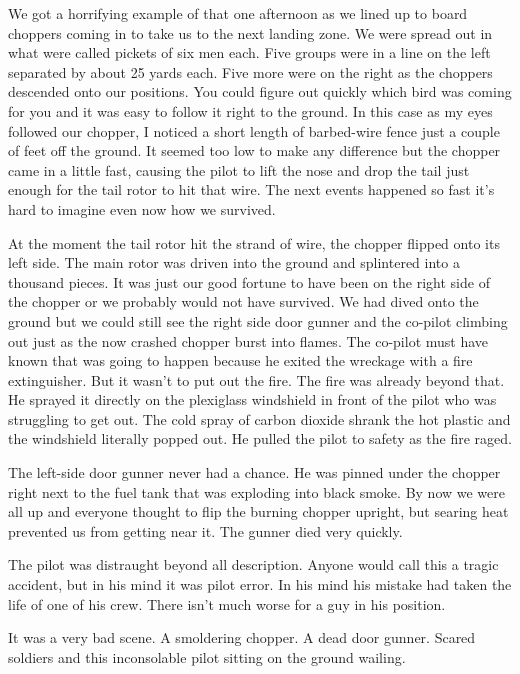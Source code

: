 We got a horrifying example of that one afternoon as we lined up to
board choppers coming in to take us to the next landing zone. We were
spread out in what were called pickets of six men each. Five groups were
in a line on the left separated by about 25 yards each. Five more were
on the right as the choppers descended onto our positions. You could
figure out quickly which bird was coming for you and it was easy to
follow it right to the ground. In this case as my eyes followed our
chopper, I noticed a short length of barbed-wire fence just a couple of
feet off the ground. It seemed too low to make any difference but the
chopper came in a little fast, causing the pilot to lift the nose and
drop the tail just enough for the tail rotor to hit that wire. The next
events happened so fast it's hard to imagine even now how we survived.

At the moment the tail rotor hit the strand of wire, the chopper flipped
onto its left side. The main rotor was driven into the ground and
splintered into a thousand pieces. It was just our good fortune to have
been on the right side of the chopper or we probably would not have
survived. We had dived onto the ground but we could still see the right
side door gunner and the co-pilot climbing out just as the now crashed
chopper burst into flames. The co-pilot must have known that was going
to happen because he exited the wreckage with a fire extinguisher. But
it wasn't to put out the fire. The fire was already beyond that. He
sprayed it directly on the plexiglass windshield in front of the pilot
who was struggling to get out. The cold spray of carbon dioxide shrank
the hot plastic and the windshield literally popped out. He pulled the
pilot to safety as the fire raged.

The left-side door gunner never had a chance. He was pinned under the
chopper right next to the fuel tank that was exploding into black smoke.
By now we were all up and everyone thought to flip the burning chopper
upright, but searing heat prevented us from getting near it. The gunner
died very quickly.

The pilot was distraught beyond all description. Anyone would call this
a tragic accident, but in his mind it was pilot error. In his mind his
mistake had taken the life of one of his crew. There isn't much worse
for a guy in his position.

It was a very bad scene. A smoldering chopper. A dead door gunner.
Scared soldiers and this inconsolable pilot sitting on the ground
wailing.

